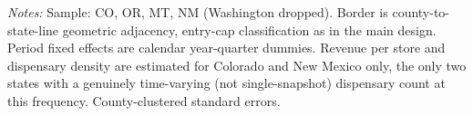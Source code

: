 \begin{table}[htbp]
\centering
\caption{Main pooled specification, quarterly panel, Washington dropped}
\label{tab:main_pooled_quarterly_noWA}
\footnotesize
{}
\begin{minipage}{0.98\textwidth}
\vspace{0.3em}
\footnotesize
\textit{Notes:} Sample: CO, OR, MT, NM (Washington dropped). Border is county-to-state-line geometric
adjacency, entry-cap classification as in the main design. Period fixed effects are calendar year-quarter dummies. Revenue per store and dispensary density are estimated for Colorado and New Mexico only, the
only two states with a genuinely time-varying (not single-snapshot) dispensary count at this frequency.
County-clustered standard errors.
\end{minipage}
\end{table}
